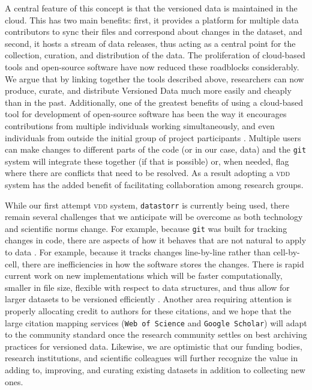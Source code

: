 \documentclass[a4paper,11pt]{article}
\begin{document}
 A central feature of this concept is that the versioned data is maintained in the cloud. This has two main benefits: first, it provides a platform for multiple data contributors to sync their files and correspond about changes in the dataset, and second, it hosts a stream of data releases, thus acting as a central point for  the collection, curation, and distribution of the data.  The proliferation of cloud-based tools and open-source software have now reduced these roadblocks considerably.  We argue that by linking together the tools described above, researchers can now produce, curate, and distribute Versioned Data much more easily and cheaply than in the past.  Additionally, one of the greatest benefits of using a cloud-based tool for development of open-source software has been the way it encourages contributions from multiple individuals working simultaneously, and even individuals from outside the initial group of project participants \citep{Rogers-2013}. Multiple users can make changes to different parts of the code (or in our case, data) and the \texttt{git} system will integrate these together (if that is possible) or, when needed, flag where there are conflicts that need to be resolved. As a result adopting a \textsc{vdd} system has the added benefit of facilitating collaboration among research groups.


 While our first attempt \textsc{vdd} system, \texttt{datastorr} is currently being used, there remain several challenges that we anticipate will be overcome as both technology and scientific norms change. For example, because \texttt{git} was built for tracking changes in code, there are aspects of how it behaves that are not natural to apply to  data \citep{Perkel-2016}.  For example, because it tracks changes line-by-line rather than cell-by-cell, there are inefficiencies in how the software stores the changes. There is rapid current work on new implementations which will be faster computationally, smaller in file size, flexible with respect to data structures, and thus allow for larger datasets to be versioned efficiently \citep{Fli, Dat}. Another area requiring attention is properly allocating credit to authors for these citations, and we hope that the large citation mapping services (\texttt{Web of Science} and \texttt{Google Scholar}) will adapt to the community standard once the research community settles on best archiving practices for versioned data. Likewise, we are optimistic that our funding bodies, research institutions, and scientific colleagues will further recognize the value in adding to, improving, and curating existing datasets in addition to collecting new ones.
\end{document}
